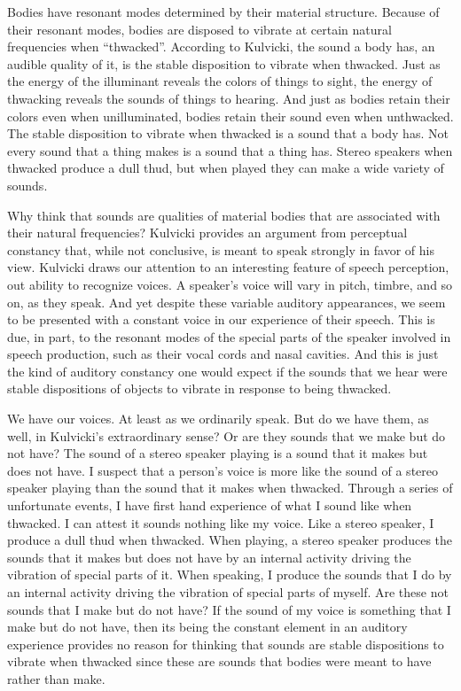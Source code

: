 \documentclass[12pt]{article}
\begin{document}
Bodies have resonant modes determined by their material structure. Because of their resonant modes, bodies are disposed to vibrate at certain natural frequencies when “thwacked”. According to Kulvicki, the sound a body has, an audible quality of it, is the stable disposition to vibrate when thwacked. Just as the energy of the illuminant reveals the colors of things to sight, the energy of thwacking reveals the sounds of things to hearing. And just as bodies retain their colors even when unilluminated, bodies retain their sound even when unthwacked. The stable disposition to vibrate when thwacked is a sound that a body has. Not every sound that a thing makes is a sound that a thing has. Stereo speakers when thwacked produce a dull thud, but when played they can make a wide variety of sounds.

Why think that sounds are qualities of material bodies that are associated with their natural frequencies? Kulvicki provides an argument from perceptual constancy that, while not conclusive, is meant to speak strongly in favor of his view. Kulvicki draws our attention to an interesting feature of speech perception, out ability to recognize voices. A speaker’s voice will vary in pitch, timbre, and so on, as they speak. And yet despite these variable auditory appearances, we seem to be presented with a constant voice in our experience of their speech. This is due, in part, to the resonant modes of the special parts of the speaker involved in speech production, such as their vocal cords and nasal cavities. And this is just the kind of auditory constancy one would expect if the sounds that we hear were stable dispositions of objects to vibrate in response to being thwacked.

We have our voices. At least as we ordinarily speak. But do we have them, as well, in Kulvicki’s extraordinary sense? Or are they sounds that we make but do not have? The sound of a stereo speaker playing is a sound that it makes but does not have. I suspect that a person’s voice is more like the sound of a stereo speaker playing than the sound that it makes when thwacked. Through a series of unfortunate events, I have first hand experience of what I sound like when thwacked. I can attest it sounds nothing like my voice. Like a stereo speaker, I produce a dull thud when thwacked. When playing, a stereo speaker produces the sounds that it makes but does not have by an internal activity driving the vibration of special parts of it. When speaking, I produce the sounds that I do by an internal activity driving the vibration of special parts of myself. Are these not sounds that I make but do not have? If the sound of my voice is something that I make but do not have, then its being the constant element in an auditory experience provides no reason for thinking that sounds are stable dispositions to vibrate when thwacked since these are sounds that bodies were meant to have rather than make. 
\end{document}
